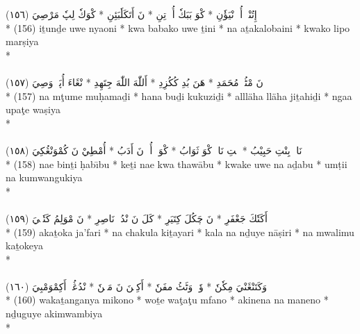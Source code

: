 \documentclass[a4paper, 12pt]{report}
\begin{document}
\begin{center}
\textarabic{(١٥٦) \textcolor{mygreen}{إِتُنْدٖ أُوٖ نْيَؤٗنِ  * كْوَ بَبَكٗ أُوٖ تِنِ  * نَ أَتَكَلٗبَئِنِ  * كْوَكٗ لِپٗ مَرْصِيَ }} \\* 
(156) iṯunḏe uwe nyaoni  * kwa babako uwe ṯini  * na aṯakalobaini  * kwako lipo marṣiya  \\* 
 \\ 
\\[8mm] 

\textarabic{(١٥٧) \textcolor{mygreen}{نَ مْٹُمٖ مُحَمَدِ  * هَنَ بُدِ كُكُزِدِ  * أَللّٰهَ اللّٰهَ جِتَهِدِ  * نْڠَاءَ أُپَٹٖ وَصِيَ }} \\* 
(157) na mţume muḥamaḏi  * hana buḏi kukuziḏi  * allläha lläha jiṯahiḏi  * ngaa upaţe waṣiya  \\* 
 \\ 
\\[8mm] 

\textarabic{(١٥٨) \textcolor{mygreen}{نَاءٖ بِنْتِ حَبِيْبُ  * كٖتِ نَاءٖ كْوَ ثَوَابُ  * كْوَكٖ أُوٖ نَ أَدَبُ  * أُمْطِيْ نَ كُمْوَنْڠُكِيَ }} \\* 
(158) nae binṯi ḥabı̄bu  * keṯi nae kwa thawābu  * kwake uwe na aḏabu  * umṭii na kumwangukiya  \\* 
 \\ 
\\[8mm] 

\textarabic{(١٥٩) \textcolor{mygreen}{أَكَتٗكَ جَعْفَرِ  * نَ چَكُلَ كِتَيَرِ  * كَلَ نَ نْدُيٖ نَاصِرِ  * نَ مْوَلِمُ كَتٗكٖيَ }} \\* 
(159) akaṯoka ja'fari  * na chakula kiṯayari  * kala na nḏuye nāṣiri  * na mwalimu kaṯokeya  \\* 
 \\ 
\\[8mm] 

\textarabic{(١٦٠) \textcolor{mygreen}{وَكَتَنْڠَنْيَ مِكٗنٗ  * وٗتٖ وَٹَٹُ مفَنٗ  * أَكِنٖنَ نَ مَنٖنٗ  * نْدُڠُيٖ أَكِمْوَمْبِيَ }} \\* 
(160) wakaṯanganya mikono  * woṯe waţaţu mfano  * akinena na maneno  * nḏuguye akimwambiya  \\* 
 \\ 
\\[8mm] 


\end{center}
\end{document}
